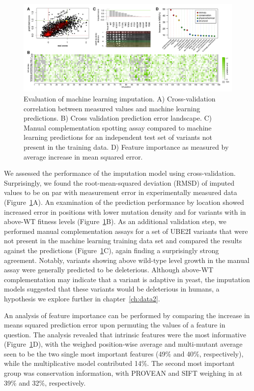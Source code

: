 \begin{landscape}
\begin{figure}[h]
	\centering
	\includegraphics[width=9in]{img/imputation.pdf}
	\caption{Evaluation of machine learning imputation. A) Cross-validation correlation between measured values and machine learning predictions. B) Cross validation prediction error landscape. C) Manual complementation spotting assay compared to machine learning predictions for an independent test set of variants not present in the training data. D) Feature importance as measured by average increase in mean squared error.}
	\label{fig:imputation}
\end{figure}
\end{landscape}

We assessed the performance of the imputation model using cross-validation. Surprisingly, we found the root-mean-squared deviation (RMSD) of imputed values to be on par with measurement error in experimentally measured data (Figure~\ref{fig:imputation}A). An examination of the prediction performance by location showed increased error in positions with lower mutation density and for variants with in above-WT fitness levels (Figure~\ref{fig:imputation}B). As an additional validation step, we performed manual complementation assays for a set of UBE2I variants that were not present in the machine learning training data set and compared the results against the predictions (Figure~\ref{fig:imputation}C), again finding a surprisingly strong agreement. Notably, variants showing above wild-type level growth in the manual assay were generally predicted to be deleterious. Although above-WT complementation may indicate that a variant is adaptive in yeast, the imputation models suggested that these variants would be deleterious in humans, a hypothesis we explore further in chapter~\ref{ch:data2}. 


An analysis of feature importance can be performed by comparing the increase in means squared prediction error upon permuting the values of a feature in question. The analysis revealed that intrinsic features were the most informative (Figure~\ref{fig:imputation}D), with the weighed position-wise average and multi-mutant average seen to be the two single most important features (49\% and 40\%, respectively), while the multiplicative model contributed 14\%. The second most important group was conservation information, with PROVEAN and SIFT weighing in at 39\% and 32\%, respectively.

